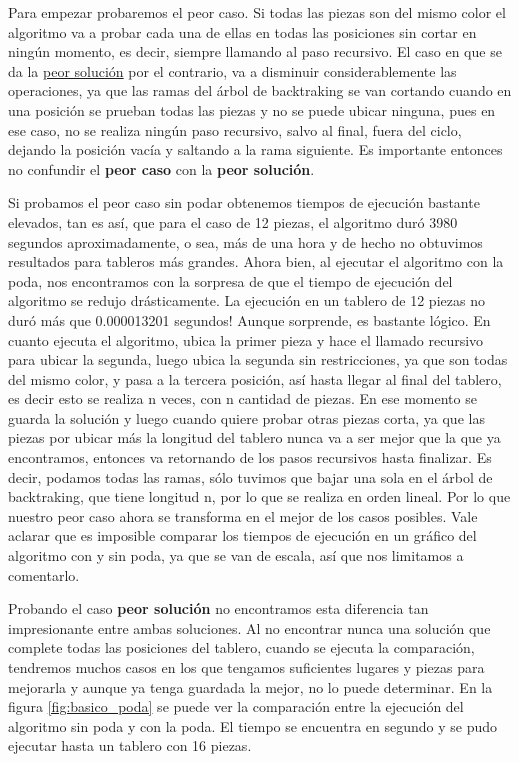 \documentclass[11pt,a4paper]{article}
\begin{document}
Para empezar probaremos el peor caso. Si todas las piezas son del mismo color el algoritmo va a probar cada una de ellas en todas las posiciones sin cortar en ningún momento, es decir, siempre llamando al paso recursivo. El caso en que se da la \underline{peor solución} por el contrario, va a disminuir considerablemente las operaciones, ya que las ramas del árbol de backtraking se van cortando cuando en una posición se prueban todas las piezas y no se puede ubicar ninguna, pues en ese caso, no se realiza ningún paso recursivo, salvo al final, fuera del ciclo, dejando la posición vacía y saltando a la rama siguiente. Es importante entonces no confundir el \textbf{peor caso} con la \textbf{peor solución}. 

Si probamos el peor caso sin podar obtenemos tiempos de ejecución bastante elevados, tan es así, que para el caso de 12 piezas, el algoritmo duró 3980 segundos aproximadamente, o sea, más de una hora y de hecho no obtuvimos resultados para tableros más grandes.
Ahora bien, al ejecutar el algoritmo con la poda, nos encontramos con la sorpresa de que el tiempo de ejecución del algoritmo se redujo drásticamente. La ejecución en un tablero de 12 piezas no duró más que 0.000013201 segundos! Aunque sorprende, es bastante lógico. En cuanto ejecuta el algoritmo, ubica la primer pieza y hace el llamado recursivo para ubicar la segunda, luego ubica la segunda sin restricciones, ya que son todas del mismo color, y pasa a la tercera posición, así hasta llegar al final del tablero, es decir esto se realiza n veces, con n cantidad de piezas. En ese momento se guarda la solución y luego cuando quiere probar otras piezas corta, ya que las piezas por ubicar más la longitud del tablero nunca va a ser mejor que la que ya encontramos, entonces va retornando de los pasos recursivos hasta finalizar. Es decir, podamos todas las ramas, sólo tuvimos que bajar una sola en el árbol de backtraking, que tiene longitud n, por lo que se realiza en orden lineal.
Por lo que nuestro peor caso ahora se transforma en el mejor de los casos posibles.
Vale aclarar que es imposible comparar los tiempos de ejecución en un gráfico del algoritmo con y sin poda, ya que se van de escala, así que nos limitamos a comentarlo.

Probando el caso \textbf{peor solución} no encontramos esta diferencia tan impresionante entre ambas soluciones. Al no encontrar nunca una solución que complete todas las posiciones del tablero, cuando se ejecuta la comparación, tendremos muchos casos en los que tengamos suficientes lugares y piezas para mejorarla y aunque ya tenga guardada la mejor, no lo puede determinar. En la figura \ref{fig:basico_poda} se puede ver la comparación entre la ejecución del algoritmo sin poda y con la poda. El tiempo se encuentra en segundo y se pudo ejecutar hasta un tablero con 16 piezas.
\end{document}
